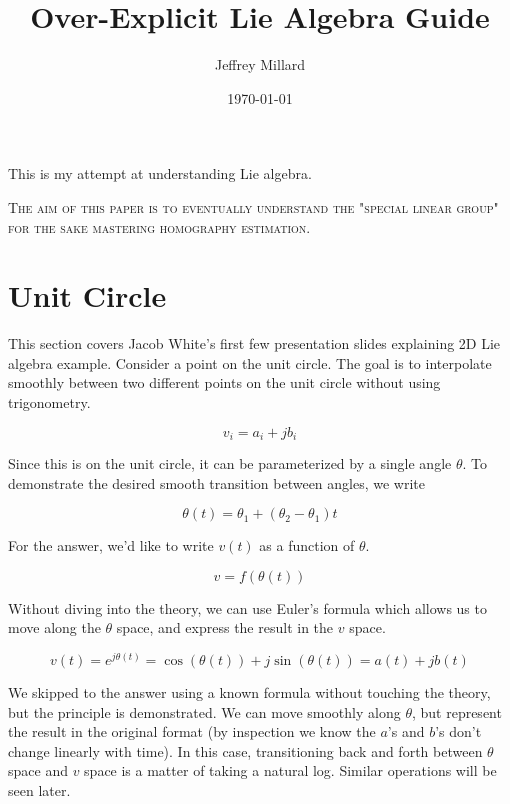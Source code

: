 \documentclass{article}
\title{Over-Explicit Lie Algebra Guide}
\date{\today}
\author{Jeffrey Millard}
\begin{document}
\maketitle

This is my attempt at understanding Lie algebra.

\textsc{The aim of this paper is to eventually understand the "special linear group" for the sake mastering homography estimation.}


\section{Unit Circle}
  This section covers Jacob White's first few presentation slides explaining 2D Lie algebra example. Consider a point on the unit circle. The goal is to interpolate smoothly between two different points on the unit circle without using trigonometry.

  \begin{equation}
    v_i = a_i + jb_i
  \end{equation}

  Since this is on the unit circle, it can be parameterized by a single angle $\theta$. To demonstrate the desired smooth transition between angles, we write

  \begin{equation}
    \theta(t) = \theta_1 + (\theta_2-\theta_1)t
  \end{equation}

  For the answer, we'd like to write $v(t)$ as a function of $\theta$.

  \begin{equation}
    v = f(\theta(t))
  \end{equation}

  Without diving into the theory, we can use Euler's formula which allows us to move along the $\theta$ space, and express the result in the $v$ space.

  \begin{equation}
    v(t) = e^{j\theta(t)} = \cos(\theta(t)) + j\sin(\theta(t)) = a(t) + jb(t)
  \end{equation}

  We skipped to the answer using a known formula without touching the theory, but the principle is demonstrated. We can move smoothly along $\theta$, but represent the result in the original format (by inspection we know the $a$'s and $b$'s don't change linearly with time). In this case, transitioning back and forth between $\theta$ space and $v$ space is a matter of taking a natural log. Similar operations will be seen later.
\end{document}
